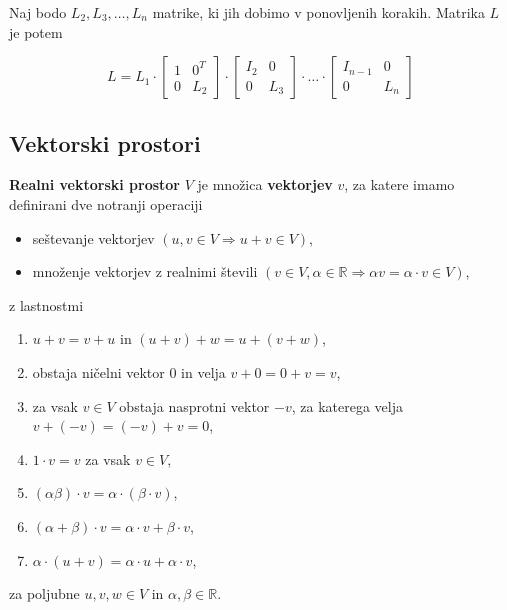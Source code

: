 \documentclass{article}
\begin{document}
\begin{multicols}{2}
Naj bodo \( L_2, L_3, \ldots, L_n \) matrike, ki jih dobimo v ponovljenih korakih. Matrika \( L \) je potem

\[
L = L_1 \cdot \left[ \begin{array}{cc}
1 & 0^T \\
0 & L_2
\end{array} \right] \cdot \left[ \begin{array}{cc}
I_2 & 0 \\
0 & L_3
\end{array} \right] \cdot \ldots \cdot \left[ \begin{array}{cc}
I_{n-1} & 0 \\
0 & L_n
\end{array} \right]
\]

\subsection{Vektorski prostori}

\textbf{Realni vektorski prostor} \( V \) je množica \textbf{vektorjev} \( v \), za katere imamo definirani dve notranji operaciji
\begin{itemize}
    \item seštevanje vektorjev \( (u, v \in V \Rightarrow u+v \in V) \),
    \item množenje vektorjev z realnimi števili \( (v \in V, \alpha \in \mathbb{R} \Rightarrow \alpha v = \alpha \cdot v \in V) \),
\end{itemize}
z lastnostmi
\begin{enumerate}
    \item \( u + v = v + u \) in \( (u + v) + w = u + (v + w) \),
    \item obstaja ničelni vektor \( 0 \) in velja \( v + 0 = 0 + v = v \),
    \item za vsak \( v \in V \) obstaja nasprotni vektor \( -v \), za katerega velja \( v + (-v) = (-v) + v = 0 \),
    \item \( 1 \cdot v = v \) za vsak \( v \in V \),
    \item \( (\alpha\beta) \cdot v = \alpha \cdot (\beta \cdot v) \),
    \item \( (\alpha + \beta) \cdot v = \alpha \cdot v + \beta \cdot v \),
    \item \( \alpha \cdot (u + v) = \alpha \cdot u + \alpha \cdot v \),
\end{enumerate}
za poljubne \( u, v, w \in V \) in \( \alpha, \beta \in \mathbb{R} \).



\end{multicols}
\end{document}
